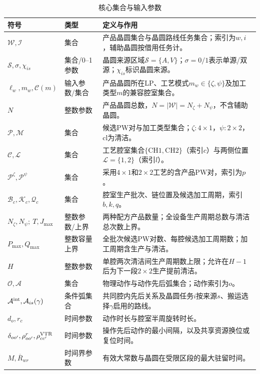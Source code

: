 \documentclass[final,5p,times,twocolumn]{elsarticle}
\begin{document}
\begin{table}[t]
\centering
\scriptsize
\setlength{\tabcolsep}{3pt}
\caption{核心集合与输入参数}
\label{tab:symbol-cn-a}
\begin{tabular}{C{0.20\textwidth}C{0.16\textwidth}C{0.43\textwidth}}
\toprule
符号 & 类型 & 定义与作用 \\
\midrule
$\mathcal W,\mathcal I$ & 集合 & 产品晶圆集合与晶圆路线任务集合；索引为$w,i$，辅助晶圆按借用任务计。\\
$\mathcal S,\sigma,\chi_{is}$ & 集合/0--1参数 & 晶圆来源区域$\mathcal S=\{A,V\}$；$\sigma=0/1$表示单源/双源；$\chi_{is}$标识晶圆来源。\\
$\ell_w,m_w,\mathcal C(m)$ & 输入参数/集合 & 产品晶圆所在LP、工艺模式$m_w\in\{\zeta,\psi\}$及加工类型$m$的兼容腔室集合。\\
$N$ & 整数参数 & 产品晶圆总数，$N=|\mathcal W|=N_{\zeta}+N_{\psi}$，不含辅助晶圆。\\
$\mathcal P,\mathcal M$ & 集合 & 候选PW对与加工类型集合；$\zeta:4\times1$，$\psi:2\times2$，$\mathrm{cl}$为清洁。\\
$\mathcal C,\mathcal L$ & 集合 & 工艺腔室集合$\{\mathrm{CH1,CH2}\}$（索引$c$）与两侧位置$\mathcal L=\{1,2\}$（索引$l$）。\\
$\mathcal P^{\zeta},\mathcal P^{\psi}$ & 集合 & 采用$4\times1$和$2\times2$工艺的含产品PW对，索引为$p$。\\
$\mathcal B_c,\mathcal K_c,\mathcal Q_c$ & 集合 & 腔室生产批次、链位置及候选加工周期，索引$b,k,q$。\\
$N_{\zeta},N_{\psi};\ T,J_{\max}$ & 整数参数/上界 & 两种配方产品数量；全设备生产周期总数与清洁总次数上界。\\
$P_{\max},Q_{\max}$ & 整数容量上界 & 全批次候选PW对数、每腔候选加工周期数；加工周期含生产与清洁。\\
$H$ & 整数参数 & 单腔两次清洁间生产周期数上限；允许在$H-1$后为下一段$2\times2$生产提前清洁。\\
$\mathcal O,\mathcal A$ & 集合 & 物理动作与动作先后弧集合；动作索引为$o$。\\
$\mathcal A^{\rm int},\mathcal A_{is}(\gamma)$ & 条件弧集合 & 共同腔内先后关系及晶圆任务$i$按来源$s$、搬运选择$\gamma$启用的路线。\\
$d_o,r_c$ & 时间参数 & 动作时长与腔室半周旋转时长。\\
$\delta_{oo'},\rho^r_{oo'},\rho^{\rm VTR}_{cc'}$ & 时间参数 & 操作先后动作的最小间隔，以及共享资源换位或复位时间。\\
$M,\overline R_{wr}$ & 时间界参数 & 有效大常数与晶圆在受限区段的最大驻留时间。\\

\end{tabular}
\end{table}
\end{document}
